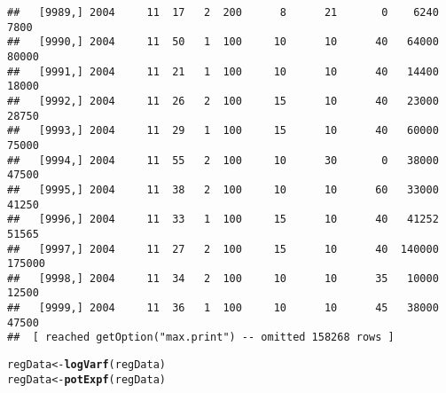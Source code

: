 \documentclass{article}\usepackage[]{graphicx}\usepackage[]{color}
\makeatletter
\newcommand{\hlstd}[1]{\textcolor[rgb]{0.345,0.345,0.345}{#1}}%
\newcommand{\hlkwb}[1]{\textcolor[rgb]{0.69,0.353,0.396}{#1}}%
\newcommand{\hlkwd}[1]{\textcolor[rgb]{0.737,0.353,0.396}{\textbf{#1}}}%
\newenvironment{kframe}{%
 \def\at@end@of@kframe{}%
 \ifinner\ifhmode%
  \def\at@end@of@kframe{\end{minipage}}%
  \begin{minipage}{\columnwidth}%
 \fi\fi%
 \def\FrameCommand##1{\hskip\@totalleftmargin \hskip-\fboxsep
 \colorbox{shadecolor}{##1}\hskip-\fboxsep
     \hskip-\linewidth \hskip-\@totalleftmargin \hskip\columnwidth}%
 \MakeFramed {\advance\hsize-\width
   \@totalleftmargin\z@ \linewidth\hsize
   \@setminipage}}%
 {\par\unskip\endMakeFramed%
 \at@end@of@kframe}
\newenvironment{knitrout}{}{} %
\makeatother
\begin{document}
\begin{knitrout}
\begin{kframe}
\begin{verbatim}
##   [9989,] 2004     11  17   2  200      8      21       0    6240    7800
##   [9990,] 2004     11  50   1  100     10      10      40   64000   80000
##   [9991,] 2004     11  21   1  100     10      10      40   14400   18000
##   [9992,] 2004     11  26   2  100     15      10      40   23000   28750
##   [9993,] 2004     11  29   1  100     15      10      40   60000   75000
##   [9994,] 2004     11  55   2  100     10      30       0   38000   47500
##   [9995,] 2004     11  38   2  100     10      10      60   33000   41250
##   [9996,] 2004     11  33   1  100     15      10      40   41252   51565
##   [9997,] 2004     11  27   2  100     15      10      40  140000  175000
##   [9998,] 2004     11  34   2  100     10      10      35   10000   12500
##   [9999,] 2004     11  36   1  100     10      10      45   38000   47500
##  [ reached getOption("max.print") -- omitted 158268 rows ]
\end{verbatim}
\begin{alltt}
\hlstd{regData} \hlkwb{<-} \hlkwd{logVarf}\hlstd{(regData)}
\hlstd{regData} \hlkwb{<-} \hlkwd{potExpf}\hlstd{(regData)}
\end{alltt}
\end{kframe}
\end{knitrout}
\end{document}
